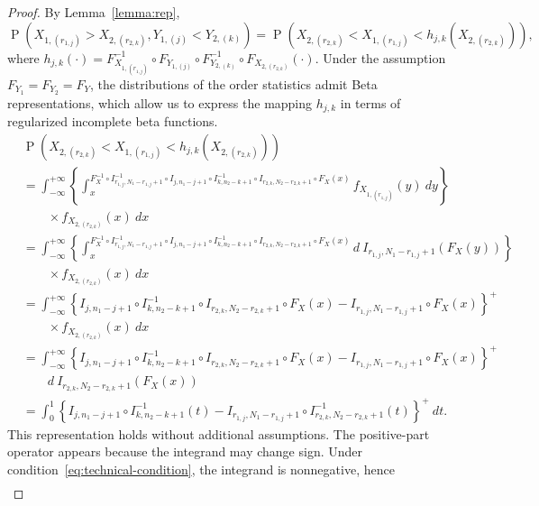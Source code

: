 \documentclass[12pt]{article}
\DeclareMathOperator*{\Prob}{P}
\begin{document}
\begin{proof}
By Lemma~\ref{lemma:rep},
$$
	\Prob\left(X_{1,(r_{1,j})} > X_{2,(r_{2,k})}, Y_{1,(j)} < Y_{2,(k)}\right) = \Prob\left( X_{2,(r_{2,k})} < X_{1,(r_{1,j})}  < h_{j,k}\left(X_{2,(r_{2,k})}\right)\right),
$$
where $h_{j,k}(\cdot) = F_{X_{1,(r_{1,j})}}^{-1} \circ F_{Y_{1, (j)}} \circ F_{Y_{2, (k)}}^{-1} \circ F_{X_{2,(r_{2,k})}} (\cdot)$. Under the assumption $F_{Y_1}=F_{Y_2}=F_Y$, the distributions of the order statistics admit Beta representations, which allow us to express the mapping $h_{j,k}$ in terms of regularized incomplete beta functions.
\begin{align*}
	&\Prob\left( X_{2,(r_{2,k})} < X_{1,(r_{1,j})}  < h_{j,k}\left(X_{2,(r_{2,k})}\right)\right) \\
	&= \int_{-\infty}^{+\infty}\left\{\int_{x}^{F_X^{-1} \circ I_{r_{1,j}, N_1-r_{1,j}+1}^{-1} \circ I_{j, n_1-j+1} \circ I_{k, n_2-k+1}^{-1} \circ I_{r_{2,k}, N_2-r_{2,k}+1} \circ F_X(x)} f_{X_{1,(r_{1,j})}}(y)\ dy\right\} \\ 
	&\qquad \times  f_{X_{2,(r_{2,k})}}(x) \ dx \\
	&= \int_{-\infty}^{+\infty}\left\{\int_{x}^{F_X^{-1} \circ I_{r_{1,j}, N_1-r_{1,j}+1}^{-1} \circ I_{j, n_1-j+1} \circ I_{k, n_2-k+1}^{-1} \circ I_{r_{2,k}, N_2-r_{2,k}+1} \circ F_X(x)} d \ I_{ r_{1,j}, N_1- r_{1,j}+1}(F_X(y))\right\} \\
	&\qquad \times f_{X_{2,(r_{2,k})}}(x) \ dx \\
	&= \int_{-\infty}^{+\infty}\left\{I_{j, n_1-j+1} \circ I_{k, n_2-k+1}^{-1} \circ I_{ r_{2,k}, N_2- r_{2,k}+1} \circ F_X(x) - I_{ r_{1,j}, N_1- r_{1,j}+1} \circ F_X(x)\right\}^+ \\ 
	&\qquad \times f_{X_{2,(r_{2,k})}}(x) \ dx \\
	&= \int_{-\infty}^{+\infty}\left\{I_{j, n_1-j+1} \circ I_{k, n_2-k+1}^{-1} \circ I_{ r_{2,k}, N_2- r_{2,k}+1} \circ F_X(x) - I_{ r_{1,j}, N_1- r_{1,j}+1} \circ F_X(x)\right\}^+ \\  
	&\qquad d \ I_{ r_{2,k}, N_2- r_{2,k}+1}(F_X(x)) \\
	&= \int_0^1 \left\{I_{j, n_1-j+1} \circ I_{k, n_2-k+1}^{-1}(t) - I_{ r_{1,j}, N_1- r_{1,j}+1} \circ I_{ r_{2,k}, N_2- r_{2,k}+1}^{-1}(t)\right\}^+	 \ dt.
\end{align*}
This representation holds without additional assumptions. The positive-part operator appears because the integrand may change sign. Under condition~\eqref{eq:technical-condition}, the integrand is nonnegative, hence
\begin{align*}

\end{align*}
\end{proof}
\end{document}
